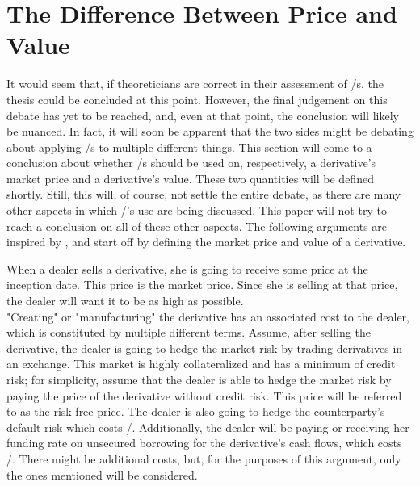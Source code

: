 \documentclass[main.tex]{subfiles}
\begin{document}
    \section{The Difference Between Price and Value}
    \label{sec:price-versus-value}

    It would seem that, if theoreticians are correct in their assessment of \FVA/s,
    the thesis could be concluded at this point.
    However, the final judgement on this debate has yet to be reached,
    and, even at that point, the conclusion will likely be nuanced.
    In fact, it will soon be apparent that the two sides might be debating
    about applying \FVA/s to multiple different things.
    This section will come to a conclusion about whether \FVA/s should be used
    on, respectively, a derivative's market price and a derivative's value.
    These two quantities will be defined shortly. 
    Still, this will, of course, not settle the entire debate,
    as there are many other aspects in which \FVA/'s use are being discussed.
    This paper will not try to reach a conclusion on all of these other aspects.
    The following arguments are inspired by \textcite{Ruiz2015XVA},
    and start off by defining the market price and value of a derivative.

    When a dealer sells a derivative, she is going to receive some price at the inception date.
    This price is the market price.
    Since she is selling at that price, the dealer will want it to be as high as possible.
    \\
    "Creating" or "manufacturing" the derivative has an associated cost to the dealer,
    which is constituted by multiple different terms.
    Assume, after selling the derivative, the dealer is going to hedge the market risk
    by trading derivatives in an exchange.
    This market is highly collateralized and has a minimum of credit risk;
    for simplicity, assume that the dealer is able to hedge the market risk by paying
    the price of the derivative without credit risk. 
    This price will be referred to as the risk-free price.
    The dealer is also going to hedge the counterparty's default risk which costs \CVA/.
    Additionally, the dealer will be paying or receiving her funding rate on unsecured borrowing
    for the derivative's cash flows, which costs \FVA/.
    There might be additional costs, 
    but, for the purposes of this argument, only the ones mentioned will be considered.
    
\end{document}
